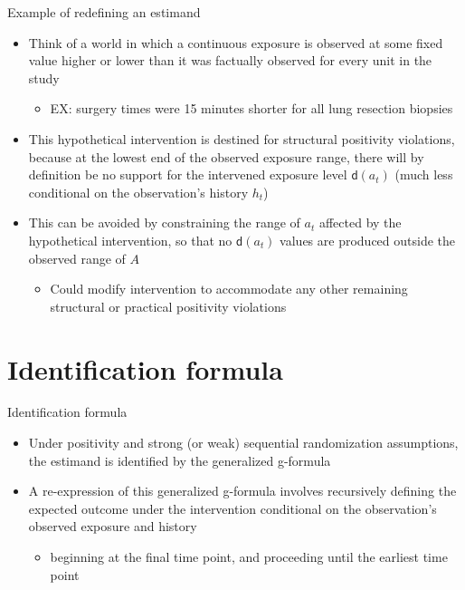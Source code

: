 \documentclass[
  10pt,
  ignorenonframetext,
]{beamer}
\providecommand{\tightlist}{%
  \setlength{\itemsep}{0pt}\setlength{\parskip}{0pt}}\usepackage{longtable,booktabs,array}
\begin{document}
\begin{frame}{Example of redefining an estimand}
\protect\hypertarget{example-of-redefining-an-estimand}{}
\begin{itemize}
\item
  Think of a world in which a continuous exposure is observed at some
  fixed value higher or lower than it was factually observed for every
  unit in the study

  \begin{itemize}
  \tightlist
  \item
    EX: surgery times were 15 minutes shorter for all lung resection
    biopsies
  \end{itemize}
\item
  This hypothetical intervention is destined for structural positivity
  violations, because at the lowest end of the observed exposure range,
  there will by definition be no support for the intervened exposure
  level \(\mathsf{d}(a_t)\) (much less conditional on the observation's
  history \(h_t\))
\item
  This can be avoided by constraining the range of \(a_t\) affected by
  the hypothetical intervention, so that no \(\mathsf{d}(a_t)\) values
  are produced outside the observed range of \(A\)

  \begin{itemize}
  \tightlist
  \item
    Could modify intervention to accommodate any other remaining
    structural or practical positivity violations
  \end{itemize}
\end{itemize}
\end{frame}

\hypertarget{identification-formula}{%
\section{Identification formula}\label{identification-formula}}

\begin{frame}{Identification formula}
\protect\hypertarget{identification-formula-1}{}
\begin{itemize}
\item
  Under positivity and strong (or weak) sequential randomization
  assumptions, the estimand is identified by the generalized g-formula
\item
  A re-expression of this generalized g-formula involves recursively
  defining the expected outcome under the intervention conditional on
  the observation's observed exposure and history

  \begin{itemize}
  \tightlist
  \item
    beginning at the final time point, and proceeding until the earliest
    time point
  \end{itemize}
\end{itemize}
\end{frame}
\end{document}
